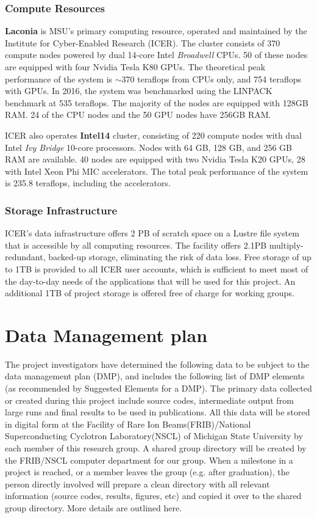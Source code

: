 \documentclass[10pt]{article}
\begin{document}
\subsubsection{Compute Resources}
\textbf{Laconia} is MSU's primary computing resource, operated and maintained
by the Institute for Cyber-Enabled Research (ICER). The cluster consists
of 370 compute nodes powered by dual 14-core Intel \emph{Broadwell} CPUs.
50 of these nodes are equipped with four Nvidia Tesla K80 GPUs. The theoretical
peak performance of the system is  $\sim$370 teraflops from CPUs only, and
754 teraflops with GPUs. In 2016, the system was benchmarked using the LINPACK
benchmark at 535 teraflops. The majority of the nodes are equipped with 128GB
RAM. 24 of the CPU nodes and the 50 GPU nodes have 256GB RAM.

ICER also operates \textbf{Intel14} cluster, consisting of 220 compute nodes
with dual Intel \emph{Ivy Bridge} 10-core processors. Nodes with 64 GB, 128 GB,
and 256 GB RAM are available. 40 nodes are equipped with two Nvidia Tesla K20
GPUs, 28 with Intel Xeon Phi MIC accelerators. The total peak performance of
the system is 235.8 teraflops, including the accelerators.

\subsubsection{Storage Infrastructure}
ICER's data infrastructure offers 2 PB of scratch space on a Lustre
file system that is accessible by all computing resources. The facility offers
2.1PB multiply-redundant, backed-up storage, eliminating the risk of data loss.
Free storage of up to 1TB is provided to all ICER user accounts, which is
sufficient to meet most of the day-to-day needs of the applications that
will be used for this project. An additional 1TB of project storage
is offered free of charge for working groups.





\section{Data Management plan}
The project investigators  have determined the following data to be subject to the data management plan
(DMP), and includes the following list of DMP elements (as recommended by Suggested Elements
for a DMP).
The primary data collected or created during this project include source codes, intermediate output from large runs and final results to
be used in publications. All this data will be stored in digital form
at the Facility of Rare Ion Beams(FRIB)/National Superconducting
Cyclotron Laboratory(NSCL) of Michigan State University by each member of this research group.  A shared
group directory will be created by the FRIB/NSCL computer department for
our group. When a milestone in a project is reached, or a member
leaves the group (e.g. after graduation), the person directly involved
will prepare a clean directory with all relevant information (source
codes, results, figures, etc) and copied it over to the shared group
directory. More details are outlined here.
 
\end{document}
